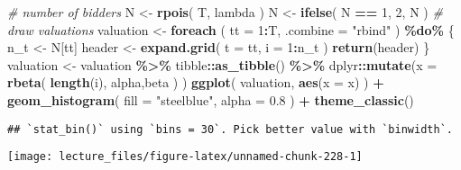 \documentclass[
]{book}
\newenvironment{Shaded}{\begin{snugshade}}{\end{snugshade}}
\newcommand{\AttributeTok}[1]{\textcolor[rgb]{0.13,0.29,0.53}{#1}}
\newcommand{\CommentTok}[1]{\textcolor[rgb]{0.56,0.35,0.01}{\textit{#1}}}
\newcommand{\DecValTok}[1]{\textcolor[rgb]{0.00,0.00,0.81}{#1}}
\newcommand{\FloatTok}[1]{\textcolor[rgb]{0.00,0.00,0.81}{#1}}
\newcommand{\FunctionTok}[1]{\textcolor[rgb]{0.13,0.29,0.53}{\textbf{#1}}}
\newcommand{\NormalTok}[1]{#1}
\newcommand{\OtherTok}[1]{\textcolor[rgb]{0.56,0.35,0.01}{#1}}
\newcommand{\SpecialCharTok}[1]{\textcolor[rgb]{0.81,0.36,0.00}{\textbf{#1}}}
\newcommand{\StringTok}[1]{\textcolor[rgb]{0.31,0.60,0.02}{#1}}
\begin{document}
\begin{Shaded}
\begin{Highlighting}[]
\CommentTok{\# number of bidders}
\NormalTok{N }\OtherTok{\textless{}{-}} 
  \FunctionTok{rpois}\NormalTok{(}
\NormalTok{    T, }
\NormalTok{    lambda}
\NormalTok{    )}
\NormalTok{N }\OtherTok{\textless{}{-}} 
  \FunctionTok{ifelse}\NormalTok{(}
\NormalTok{    N }\SpecialCharTok{==} \DecValTok{1}\NormalTok{, }
    \DecValTok{2}\NormalTok{, }
\NormalTok{    N}
\NormalTok{    )}
\CommentTok{\# draw valuations}
\NormalTok{valuation }\OtherTok{\textless{}{-}}
  \FunctionTok{foreach}\NormalTok{ (}
    \AttributeTok{tt =} \DecValTok{1}\SpecialCharTok{:}\NormalTok{T, }
    \AttributeTok{.combine =} \StringTok{"rbind"}
\NormalTok{    ) }\SpecialCharTok{\%do\%}\NormalTok{ \{}
\NormalTok{    n\_t }\OtherTok{\textless{}{-}}\NormalTok{ N[tt]}
\NormalTok{    header }\OtherTok{\textless{}{-}} 
      \FunctionTok{expand.grid}\NormalTok{(}
        \AttributeTok{t =}\NormalTok{ tt,}
        \AttributeTok{i =} \DecValTok{1}\SpecialCharTok{:}\NormalTok{n\_t}
\NormalTok{        ) }
    \FunctionTok{return}\NormalTok{(header)}
\NormalTok{  \}}
\NormalTok{valuation }\OtherTok{\textless{}{-}} 
\NormalTok{  valuation }\SpecialCharTok{\%\textgreater{}\%}
\NormalTok{  tibble}\SpecialCharTok{::}\FunctionTok{as\_tibble}\NormalTok{() }\SpecialCharTok{\%\textgreater{}\%}
\NormalTok{  dplyr}\SpecialCharTok{::}\FunctionTok{mutate}\NormalTok{(}\AttributeTok{x =} 
                  \FunctionTok{rbeta}\NormalTok{(}
                    \FunctionTok{length}\NormalTok{(i),}
\NormalTok{                    alpha,beta}
\NormalTok{                    )}
\NormalTok{                )}
\FunctionTok{ggplot}\NormalTok{(}
\NormalTok{  valuation, }
  \FunctionTok{aes}\NormalTok{(}\AttributeTok{x =}\NormalTok{ x)}
\NormalTok{  ) }\SpecialCharTok{+} 
  \FunctionTok{geom\_histogram}\NormalTok{(}
    \AttributeTok{fill =} \StringTok{"steelblue"}\NormalTok{,}
    \AttributeTok{alpha =} \FloatTok{0.8}
\NormalTok{    ) }\SpecialCharTok{+} 
  \FunctionTok{theme\_classic}\NormalTok{()}
\end{Highlighting}
\end{Shaded}

\begin{verbatim}
## `stat_bin()` using `bins = 30`. Pick better value with `binwidth`.
\end{verbatim}

\begin{center}\texttt{[image: lecture\_files/figure-latex/unnamed-chunk-228-1]} \end{center}
\end{document}
